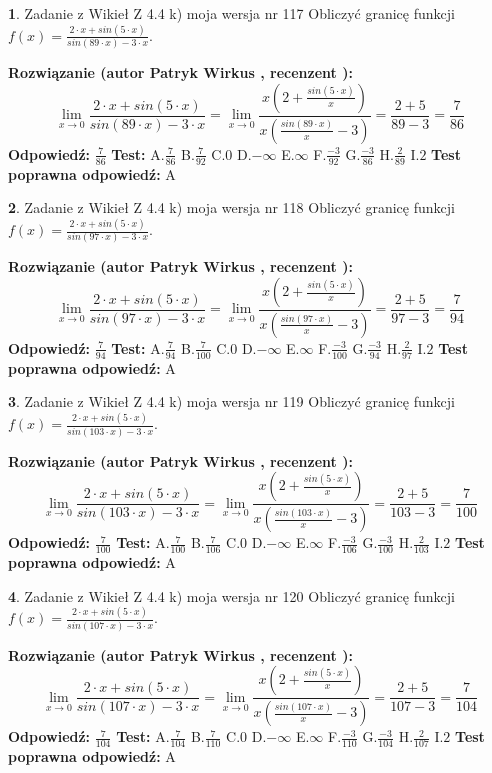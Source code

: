 \documentclass[12pt, a4paper]{article}
\theoremstyle{definition} %
\newtheorem{zad}{}
\newcommand{\zadStart}[1]{\begin{zad}#1\newline}
\newcommand{\zadStop}{\end{zad}}
\newcommand{\rozwStart}[2]{\noindent \textbf{Rozwiązanie (autor #1 , recenzent #2): }\newline}
\newcommand{\rozwStop}{\newline}
\newcommand{\odpStart}{\noindent \textbf{Odpowiedź:}\newline}
\newcommand{\odpStop}{\newline}
\newcommand{\testStart}{\noindent \textbf{Test:}\newline}
\newcommand{\testStop}{\newline}
\newcommand{\kluczStart}{\noindent \textbf{Test poprawna odpowiedź:}\newline}
\newcommand{\kluczStop}{\newline}
\begin{document}
\zadStart{Zadanie z Wikieł Z 4.4 k) moja wersja nr 117}
Obliczyć granicę funkcji $f(x)=\frac{2\cdot x +sin(5\cdot x)}{sin(89\cdot x) -3\cdot x}$.
\zadStop
\rozwStart{Patryk Wirkus}{}
$$\lim\limits_{x\to 0}\frac{2\cdot x +sin(5\cdot x)}{sin(89\cdot x) -3\cdot x}
=\lim\limits_{x\to 0}\frac{x(2+\frac{sin(5\cdot x)}{x})}{x(\frac{sin(89\cdot x)}{x}-3)}
=\frac{2+5}{89-3} = \frac{7}{86}$$
\rozwStop
\odpStart
$\frac{7}{86}$
\odpStop
\testStart
A.$\frac{7}{86}$
B.$\frac{7}{92}$
C.$0$
D.$-\infty$
E.$\infty$
F.$\frac{-3}{92}$
G.$\frac{-3}{86}$
H.$\frac{2}{89}$
I.$2$
\testStop
\kluczStart
A
\kluczStop



\zadStart{Zadanie z Wikieł Z 4.4 k) moja wersja nr 118}
Obliczyć granicę funkcji $f(x)=\frac{2\cdot x +sin(5\cdot x)}{sin(97\cdot x) -3\cdot x}$.
\zadStop
\rozwStart{Patryk Wirkus}{}
$$\lim\limits_{x\to 0}\frac{2\cdot x +sin(5\cdot x)}{sin(97\cdot x) -3\cdot x}
=\lim\limits_{x\to 0}\frac{x(2+\frac{sin(5\cdot x)}{x})}{x(\frac{sin(97\cdot x)}{x}-3)}
=\frac{2+5}{97-3} = \frac{7}{94}$$
\rozwStop
\odpStart
$\frac{7}{94}$
\odpStop
\testStart
A.$\frac{7}{94}$
B.$\frac{7}{100}$
C.$0$
D.$-\infty$
E.$\infty$
F.$\frac{-3}{100}$
G.$\frac{-3}{94}$
H.$\frac{2}{97}$
I.$2$
\testStop
\kluczStart
A
\kluczStop



\zadStart{Zadanie z Wikieł Z 4.4 k) moja wersja nr 119}
Obliczyć granicę funkcji $f(x)=\frac{2\cdot x +sin(5\cdot x)}{sin(103\cdot x) -3\cdot x}$.
\zadStop
\rozwStart{Patryk Wirkus}{}
$$\lim\limits_{x\to 0}\frac{2\cdot x +sin(5\cdot x)}{sin(103\cdot x) -3\cdot x}
=\lim\limits_{x\to 0}\frac{x(2+\frac{sin(5\cdot x)}{x})}{x(\frac{sin(103\cdot x)}{x}-3)}
=\frac{2+5}{103-3} = \frac{7}{100}$$
\rozwStop
\odpStart
$\frac{7}{100}$
\odpStop
\testStart
A.$\frac{7}{100}$
B.$\frac{7}{106}$
C.$0$
D.$-\infty$
E.$\infty$
F.$\frac{-3}{106}$
G.$\frac{-3}{100}$
H.$\frac{2}{103}$
I.$2$
\testStop
\kluczStart
A
\kluczStop



\zadStart{Zadanie z Wikieł Z 4.4 k) moja wersja nr 120}
Obliczyć granicę funkcji $f(x)=\frac{2\cdot x +sin(5\cdot x)}{sin(107\cdot x) -3\cdot x}$.
\zadStop
\rozwStart{Patryk Wirkus}{}
$$\lim\limits_{x\to 0}\frac{2\cdot x +sin(5\cdot x)}{sin(107\cdot x) -3\cdot x}
=\lim\limits_{x\to 0}\frac{x(2+\frac{sin(5\cdot x)}{x})}{x(\frac{sin(107\cdot x)}{x}-3)}
=\frac{2+5}{107-3} = \frac{7}{104}$$
\rozwStop
\odpStart
$\frac{7}{104}$
\odpStop
\testStart
A.$\frac{7}{104}$
B.$\frac{7}{110}$
C.$0$
D.$-\infty$
E.$\infty$
F.$\frac{-3}{110}$
G.$\frac{-3}{104}$
H.$\frac{2}{107}$
I.$2$
\testStop
\kluczStart
A
\kluczStop
\end{document}
